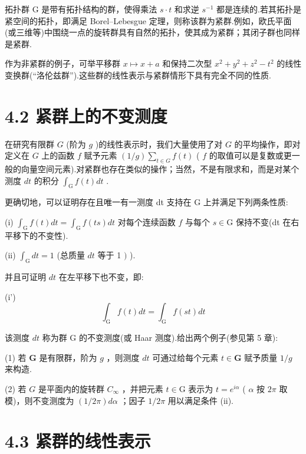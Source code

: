 \documentclass[10pt]{article}
\begin{document}
拓扑群 G 是带有拓扑结构的群，使得乘法 \(s \cdot  t\) 和求逆 \({s}^{-1}\) 都是连续的.若其拓扑是紧空间的拓扑，即满足 Borel–Lebesgue 定理，则称该群为紧群.例如，欧氏平面(或三维等)中围绕一点的旋转群具有自然的拓扑，使其成为紧群；其闭子群也同样是紧群.

作为非紧群的例子，可举平移群 \(x \mapsto  x + a\) 和保持二次型 \({x}^{2} + {y}^{2} + {z}^{2} - {t}^{2}\) 的线性变换群(“洛伦兹群”).这些群的线性表示与紧群情形下具有完全不同的性质.

\section*{4.2 紧群上的不变测度}

在研究有限群 \(G\) (阶为 \(g\) )的线性表示时，我们大量使用了对 \(G\) 的平均操作，即对定义在 \(G\) 上的函数 \(f\) 赋予元素 \(\left( {1/g}\right) \mathop{\sum }\limits_{{t \in  G}}f\left( t\right)\) ( \(f\) 的取值可以是复数或更一般的向量空间元素).对紧群也存在类似的操作；当然，不是有限求和，而是对某个测度 \({dt}\) 的积分 \({\int }_{\mathrm{G}}f\left( t\right) {dt}\) .

更确切地，可以证明存在且唯一有一测度 dt 支持在 G 上并满足下列两条性质:

(i) \({\int }_{\mathrm{G}}f\left( t\right) {dt} = {\int }_{\mathrm{G}}f\left( {ts}\right) {dt}\) 对每个连续函数 \(f\) 与每个 \(s \in  \mathrm{G}\) 保持不变(dt 在右平移下的不变性).

(ii) \({\int }_{\mathrm{G}}{dt} = 1\) (总质量 \({dt}\) 等于 1 \()\) ).

并且可证明 \({dt}\) 在左平移下也不变，即:

(i')
\[
{\int }_{\mathrm{G}}f\left( t\right) {dt} = {\int }_{\mathrm{G}}f\left( {st}\right) {dt}
\]

该测度 \({dt}\) 称为群 G 的不变测度(或 Haar 测度).给出两个例子(参见第 5 章):

(1) 若 \(\mathbf{G}\) 是有限群，阶为 \(g\) ，则测度 \({dt}\) 可通过给每个元素 \(t \in  \mathbf{G}\) 赋予质量 \(1/g\) 来构造.

(2) 若 \(G\) 是平面内的旋转群 \({C}_{\infty }\) ，并把元素 \(t \in  \mathrm{G}\) 表示为 \(t = {e}^{i\alpha }\) ( \(\alpha\) 按 \({2\pi }\) 取模)，则不变测度为 \(\left( {1/{2\pi }}\right) {d\alpha }\) ；因子 \(1/{2\pi }\) 用以满足条件 (ii).

\section*{4.3 紧群的线性表示}
\end{document}
